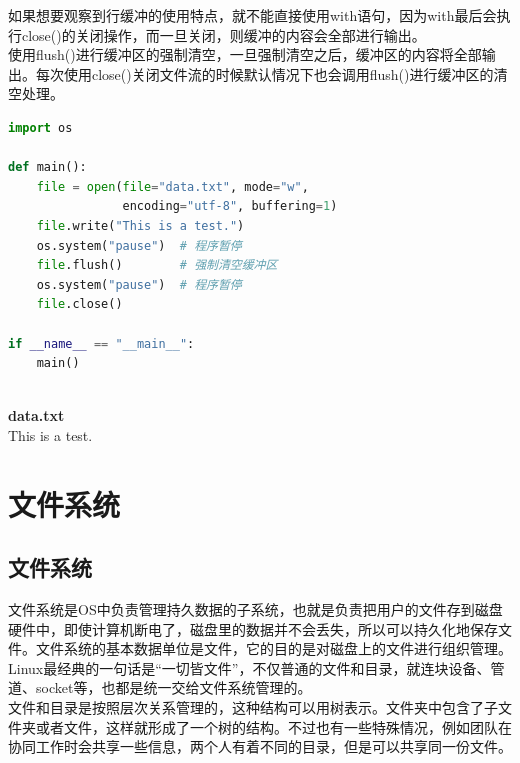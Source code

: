 如果想要观察到行缓冲的使用特点，就不能直接使用with语句，因为with最后会执行close()的关闭操作，而一旦关闭，则缓冲的内容会全部进行输出。 \\

使用flush()进行缓冲区的强制清空，一旦强制清空之后，缓冲区的内容将全部输出。每次使用close()关闭文件流的时候默认情况下也会调用flush()进行缓冲区的清空处理。 \\

\begin{lstlisting}[language=Python]
import os

def main():
    file = open(file="data.txt", mode="w",
                encoding="utf-8", buffering=1)
    file.write("This is a test.")
    os.system("pause")  # 程序暂停
    file.flush()        # 强制清空缓冲区
    os.system("pause")  # 程序暂停
    file.close()

if __name__ == "__main__":
    main()
\end{lstlisting}

\begin{tcolorbox}
	 \\
	\textbf{data.txt} \\
	This is a test.
\end{tcolorbox}

\newpage

\section{文件系统}

\subsection{文件系统}

文件系统是OS中负责管理持久数据的子系统，也就是负责把用户的文件存到磁盘硬件中，即使计算机断电了，磁盘里的数据并不会丢失，所以可以持久化地保存文件。文件系统的基本数据单位是文件，它的目的是对磁盘上的文件进行组织管理。 \\

Linux最经典的一句话是``一切皆文件”，不仅普通的文件和目录，就连块设备、管道、socket等，也都是统一交给文件系统管理的。 \\

文件和目录是按照层次关系管理的，这种结构可以用树表示。文件夹中包含了子文件夹或者文件，这样就形成了一个树的结构。不过也有一些特殊情况，例如团队在协同工作时会共享一些信息，两个人有着不同的目录，但是可以共享同一份文件。 \\

